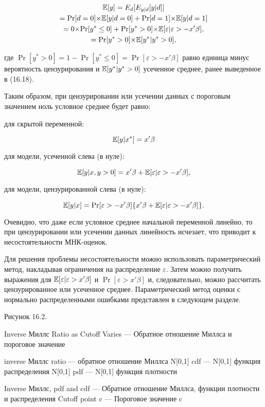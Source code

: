 \begin{multline}
\mathbb{E}[y]=E_{d}[E_{y|d}[y|d]] \\
=\mathrm{Pr}[ d=0]{\times}\mathbb{E}[y|d=0]+\mathrm{Pr}[ d=1]{\times}\mathbb{E}[y|d=1]\\
=0{\times}\mathrm{Pr}[ y^*  \leq 0]+\mathrm{Pr}[ y^* >0]{\times}\mathbb{E}[\varepsilon|\varepsilon>-x'\beta],\\
=\mathrm{Pr}[ y^* >0]{\times}\mathbb{E}[y^* |y^* >0],
\end{multline}

где $\Pr[ y^* >0]=1-\Pr[ y^*  \leq 0]=\Pr[ \varepsilon>-x'\beta]$ равно единица минус вероятность цензурирования и $\mathbb{E}[y^* |y^* >0]$ усеченное среднее, ранее выведенное в (16.18).

Таким образом, при цензурировании или усечении данных с пороговым значением ноль условное среднее будет равно:

для скрытой переменной:

\[\mathbb{E}[y|x^{*}]=x'\beta\]

для модели, усеченной слева (в нуле):

\begin{equation}
\mathbb{E}[y|x,y>0]=x'\beta+\mathbb{E}[\varepsilon|\varepsilon>-x'\beta],
\end{equation}

для модели, цензурированной слева (в нуле): 

\[
\mathbb{E}[y|x]=\mathrm{Pr}[ {\varepsilon}>-x'\beta]\lbrace{x'\beta+\mathbb{E}[\varepsilon|\varepsilon>{-x}'\beta]}\rbrace.
\]

Очевидно, что даже если условное среднее начальной переменной линейно, то при цензурировании или усечении данных линейность исчезает, что приводит к несостоятельности МНК-оценок.

Для решения проблемы несостоятельности можно использовать параметрический метод, накладывая ограничения на распределение $\varepsilon$. Затем можно получить выражения для $\mathbb{E}[\varepsilon|\varepsilon>x'\beta]$ и $\Pr[ \varepsilon>x'\beta]$ и, следовательно, можно рассчитать цензурированное или усеченное среднее. Параметрический метод оценки с нормально распределенными ошибками представлен в следующем разделе.

Рисунок 16.2.

Inverse Миллс Ratio as Cutoff Varies --- Обратное отношение Миллса и пороговое значение

inverse Миллс ratio --- обратное отношение Миллса
N[0,1] cdf --- N[0,1] функция распределения
N[0,1] pdf --- N[0,1] функция плотности

Inverse Миллс, pdf and cdf --- Обратное отношение Миллса, функции плотности и распределения
Cutoff point c --- Пороговое значение c

